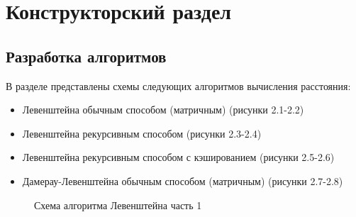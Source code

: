 \chapter{Конструкторский раздел}
\section{Разработка алгоритмов}
В разделе представлены схемы следующих алгоритмов вычисления расстояния:
\begin{itemize}
	\item Левенштейна обычным способом (матричным) (рисунки 2.1-2.2)
	\item Левенштейна рекурсивным способом (рисунки 2.3-2.4)
	\item Левенштейна рекурсивным способом с кэшированием (рисунки 2.5-2.6)
	\item Дамерау-Левенштейна обычным способом (матричным) (рисунки 2.7-2.8)
\end{itemize}

\begin{figure}
	\caption{Схема алгоритма Левенштейна часть 1}
\end{figure}

